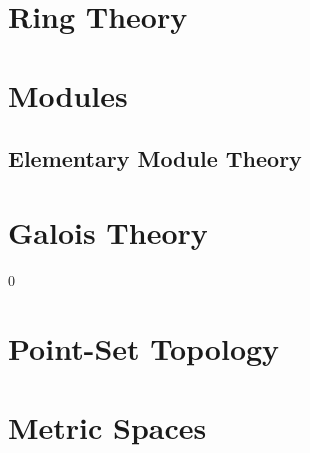 \documentclass{book}                                                           %
\newcommand*{\TOPPATH}{books}
\newcommand*{\PARPATH}{\TOPPATH/}
\newcommand*{\PATH}{\TOPPATH/}
\newcounter{endpage}
\def\compiletopology{1}
\begin{document}
            \part{Ring Theory}
                \renewcommand{\PARPATH}{\TOPPATH/Algebra/Ring_Theory}
                
            \part{Modules}
                \renewcommand{\PARPATH}{\TOPPATH/Algebra/Modules}
                \chapter{Elementary  Module Theory}
                    \renewcommand{\PATH}{\PARPATH/Elementary_Properties}
                    \label{chapt:Elementary_Module_Theory}%
                    
            \part{Galois Theory}
                \renewcommand{\PARPATH}{\TOPPATH/Algebra/Galois_Theory}
                
        \clearpage
        \setcounter{endpage}{\thepage}
    \fi

    \if\compiletopology0
        \label{book:Topology}%
    \else
            \label{book:Topology}%
            \renewcommand{\PATH}{\TOPPATH/Topology}
            \setcounter{page}{\value{endpage}}
            \part{Point-Set Topology}
                
                
            \part{Metric Spaces}
\end{document}
